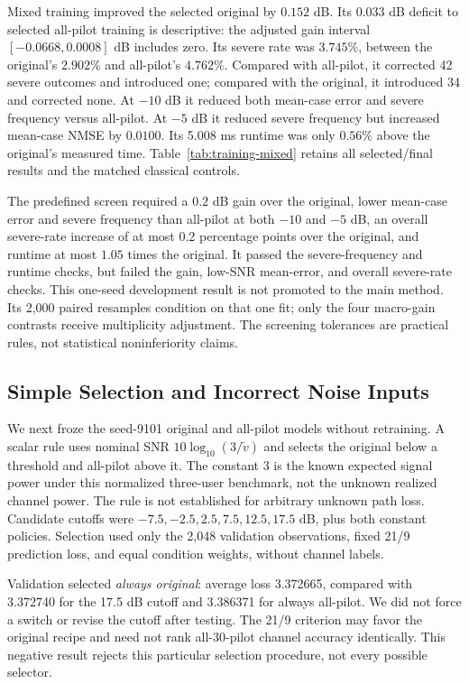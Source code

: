 Mixed training improved the selected original by $0.152$ dB. Its
$0.033$ dB deficit to selected all-pilot training is descriptive: the
adjusted gain interval $[-0.0668,0.0008]$ dB includes zero. Its severe rate was
$3.745\%$, between the original's $2.902\%$ and all-pilot's $4.762\%$.
Compared with all-pilot, it corrected 42 severe outcomes and introduced
one; compared with the original, it introduced 34 and corrected none.
At $-10$ dB it reduced both mean-case error and severe frequency versus
all-pilot. At $-5$ dB it reduced severe frequency but increased mean-case
NMSE by $0.0100$. Its 5.008 ms runtime was only $0.56\%$ above the
original's measured time. Table~\ref{tab:training-mixed} retains all
selected/final results and the matched classical controls.

The predefined screen required a $0.2$ dB gain over the original,
lower mean-case error and severe frequency than all-pilot at both
$-10$ and $-5$ dB, an overall severe-rate increase of at most 0.2
percentage points over the original, and runtime at most $1.05$ times
the original. It passed the severe-frequency and runtime checks, but
failed the gain, low-SNR mean-error, and overall severe-rate checks.
This one-seed development result is not promoted to the main method.
Its 2,000 paired resamples condition on that one fit; only the four
macro-gain contrasts receive multiplicity adjustment. The screening
tolerances are practical rules, not statistical noninferiority claims.

\subsection{Simple Selection and Incorrect Noise Inputs}

We next froze the seed-9101 original and all-pilot models without
retraining. A scalar rule uses nominal SNR $10\log_{10}(3/\widetilde v)$
and selects the original below a threshold and all-pilot above it.
The constant 3 is the known expected signal power under this normalized
three-user benchmark, not the unknown realized channel power. The rule
is not established for arbitrary unknown path loss. Candidate cutoffs
were $-7.5,-2.5,2.5,7.5,12.5,17.5$ dB, plus both constant policies.
Selection used only the 2,048 validation observations, fixed 21/9
prediction loss, and equal condition weights, without channel labels.

Validation selected \emph{always original}: average loss 3.372665,
compared with 3.372740 for the 17.5 dB cutoff and 3.386371 for always
all-pilot. We did not force a switch or revise the cutoff after testing.
The 21/9 criterion may favor the original recipe and need not rank
all-30-pilot channel accuracy identically. This negative result rejects
this particular selection procedure, not every possible selector.

